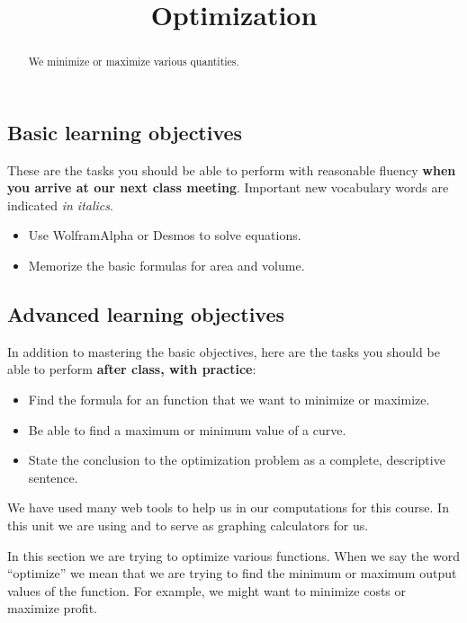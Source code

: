 \documentclass{ximera}
\title{Optimization}
\begin{document}
\begin{abstract}
We minimize or maximize various quantities.
\end{abstract}
\maketitle

\subsection*{Basic learning objectives}

These are the tasks you should be able to perform with reasonable fluency \textbf{when you arrive at our next class meeting}. Important new vocabulary words are indicated \emph{in italics}. 

\begin{itemize}
	\item Use WolframAlpha or Desmos to solve equations.
    \item Memorize the basic formulas for area and volume.
\end{itemize}

\subsection*{Advanced learning objectives}

In addition to mastering the basic objectives, here are the tasks you should be able to perform \textbf{after class, with practice}: 

\begin{itemize}
	\item Find the formula for an function that we want to minimize or maximize.
    \item Be able to find a maximum or minimum value of a curve.
    \item State the conclusion to the optimization problem as a complete, descriptive sentence.
\end{itemize}

\noindent\hrulefill

We have used many web tools to help us in our computations for this course. In this unit we are using  and  to serve as graphing calculators for us. 

In this section we are trying to optimize various functions. When we say the word ``optimize'' we mean that we are trying to find the minimum or maximum output values of the function. For example, we might want to minimize costs or maximize profit.
\end{document}
